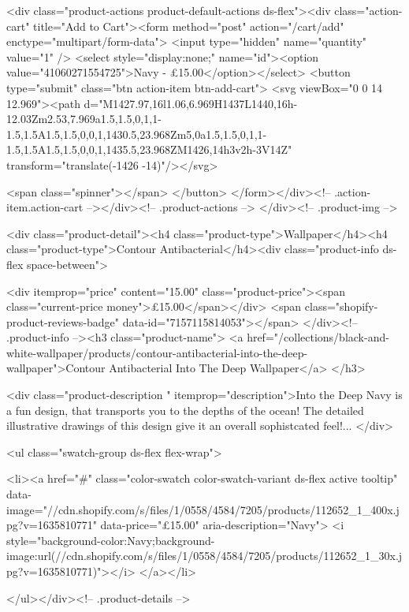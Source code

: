 {{{{{{{<div class="product-actions product-default-actions ds-flex"><div class="action-cart" title="Add to Cart"><form method="post" action="/cart/add" enctype="multipart/form-data">
            <input type="hidden" name="quantity" value="1" />
            <select style="display:none;" name="id"><option value="41060271554725">Navy - £15.00</option></select>
            <button type="submit" class="btn action-item btn-add-cart">
              <svg viewBox="0 0 14 12.969"><path d="M1427.97,16l1.06,6.969H1437L1440,16h-12.03Zm2.53,7.969a1.5,1.5,0,1,1-1.5,1.5A1.5,1.5,0,0,1,1430.5,23.968Zm5,0a1.5,1.5,0,1,1-1.5,1.5A1.5,1.5,0,0,1,1435.5,23.968ZM1426,14h3v2h-3V14Z" transform="translate(-1426 -14)"/></svg>

              <span class="spinner"></span>
            </button>
          </form></div><!-- .action-item.action-cart --></div><!-- .product-actions -->
</div><!-- .product-img -->

<div class="product-detail"><h4 class="product-type">Wallpaper</h4><h4 class="product-type">Contour Antibacterial</h4><div class="product-info ds-flex space-between">
    
<div itemprop="price" content="15.00" class="product-price"><span class="current-price money">£15.00</span></div>
    <span class="shopify-product-reviews-badge" data-id="7157115814053"></span>
  </div><!-- .product-info --><h3 class="product-name">
      <a href="/collections/black-and-white-wallpaper/products/contour-antibacterial-into-the-deep-wallpaper">Contour Antibacterial Into The Deep Wallpaper</a>
    </h3>
    
<div class="product-description " itemprop="description">Into the Deep Navy is a fun design, that transports you to the depths of the ocean! The detailed illustrative drawings of this design give it an overall sophistcated feel!...
</div>



<ul class="swatch-group ds-flex flex-wrap">
        
<li><a href="#" class="color-swatch color-swatch-variant ds-flex active tooltip" data-image="//cdn.shopify.com/s/files/1/0558/4584/7205/products/112652_1_400x.jpg?v=1635810771" data-price="£15.00" aria-description="Navy">
              <i style="background-color:Navy;background-image:url(//cdn.shopify.com/s/files/1/0558/4584/7205/products/112652_1_30x.jpg?v=1635810771)"></i>
            </a></li>

      </ul></div><!-- .product-details -->

}}}}}}}
